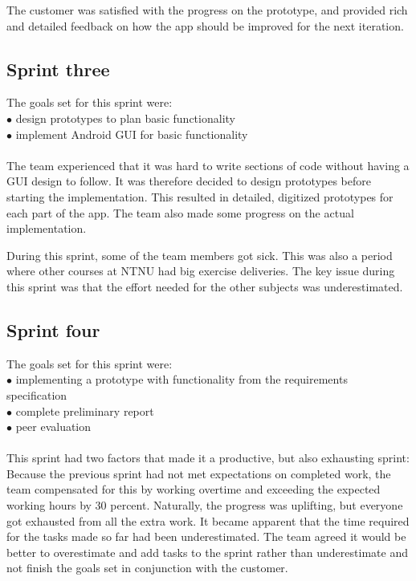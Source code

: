 The customer was satisfied with the progress on the prototype, and provided rich and detailed feedback on how the app should be improved for the next iteration.

\subsection{Sprint three}
The goals set for this sprint were:\\
$\bullet$\hspace{0.25cm} design prototypes to plan basic functionality\\
$\bullet$\hspace{0.25cm} implement Android GUI for basic functionality\\\\
The team experienced that it was hard to write sections of code without having a GUI design to follow. It was therefore decided to design prototypes before starting the implementation. This resulted in detailed, digitized prototypes for each part of the app. The team also made some progress on the actual implementation.

During this sprint, some of the team members got sick. This was also a period where other courses at NTNU had big exercise deliveries. The key issue during this sprint was that the effort needed for the other subjects was underestimated. 

\subsection{Sprint four}
The goals set for this sprint were:\\
$\bullet$\hspace{0.25cm} implementing a prototype with functionality from the requirements specification\\
$\bullet$\hspace{0.25cm} complete preliminary report\\
$\bullet$\hspace{0.25cm} peer evaluation\\\\
This sprint had two factors that made it a productive, but also exhausting sprint: Because the previous sprint had not met expectations on completed work, the team compensated for this by working overtime and exceeding the expected working hours by 30 percent. Naturally, the progress was uplifting, but everyone got exhausted from all the extra work. It became apparent that the time required for the tasks made so far had been underestimated. The team agreed it would be better to overestimate and add tasks to the sprint rather than underestimate and not finish the goals set in conjunction with the customer.

